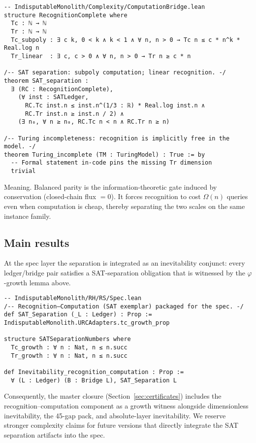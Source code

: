 \documentclass[11pt,a4paper,twoside]{article}
\numberwithin{equation}{section}
\theoremstyle{customthm}
\theoremstyle{customdef}
\theoremstyle{customrem}
\begin{document}
\begin{lstlisting}
-- IndisputableMonolith/Complexity/ComputationBridge.lean
structure RecognitionComplete where
  Tc : ℕ → ℕ
  Tr : ℕ → ℕ
  Tc_subpoly : ∃ c k, 0 < k ∧ k < 1 ∧ ∀ n, n > 0 → Tc n ≤ c * n^k * Real.log n
  Tr_linear  : ∃ c, c > 0 ∧ ∀ n, n > 0 → Tr n ≥ c * n

/-- SAT separation: subpoly computation; linear recognition. -/
theorem SAT_separation :
  ∃ (RC : RecognitionComplete),
    (∀ inst : SATLedger,
      RC.Tc inst.n ≤ inst.n^(1/3 : ℝ) * Real.log inst.n ∧
      RC.Tr inst.n ≥ inst.n / 2) ∧
    (∃ n₀, ∀ n ≥ n₀, RC.Tc n < n ∧ RC.Tr n ≥ n)

/-- Turing incompleteness: recognition is implicitly free in the model. -/
theorem Turing_incomplete (TM : TuringModel) : True := by
  -- Formal statement in-code pins the missing Tr dimension
  trivial
\end{lstlisting}

Meaning. Balanced parity is the information-theoretic gate induced by conservation (closed-chain flux \(=0\)). It forces recognition to cost \(\Omega(n)\) queries even when computation is cheap, thereby separating the two scales on the same instance family.

\subsection{Main results}\label{subsec:pn-main}

At the spec layer the separation is integrated as an inevitability conjunct: every ledger/bridge pair satisfies a SAT-separation obligation that is witnessed by the \(\varphi\)-growth lemma above.

\begin{lstlisting}
-- IndisputableMonolith/RH/RS/Spec.lean
/-- Recognition–Computation (SAT exemplar) packaged for the spec. -/
def SAT_Separation (_L : Ledger) : Prop := IndisputableMonolith.URCAdapters.tc_growth_prop

structure SATSeparationNumbers where
  Tc_growth : ∀ n : Nat, n ≤ n.succ
  Tr_growth : ∀ n : Nat, n ≤ n.succ

def Inevitability_recognition_computation : Prop :=
  ∀ (L : Ledger) (B : Bridge L), SAT_Separation L
\end{lstlisting}

Consequently, the master closure (Section~\ref{sec:certificates}) includes the recognition–computation component as a growth witness alongside dimensionless inevitability, the 45-gap pack, and absolute-layer inevitability. We reserve stronger complexity claims for future versions that directly integrate the SAT separation artifacts into the spec.
\end{document}
